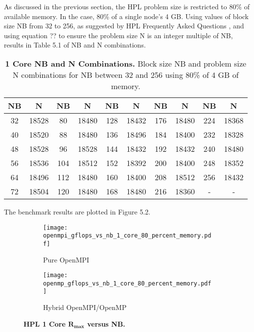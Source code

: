 As discussed in the previous section, the HPL problem size is restricted to 80\% of available memory. In the case, 80\% of a single node's 4 GB. Using values of block size NB from 32 to 256, as suggested by HPL Frequently Asked Questions \cite{hpl-faq}, and using equation ?? to ensure the problem size N is an integer multiple of NB, results in Table 5.1 of NB and N combinations.

\begin{table}[H]
\begin{center}
	\begin{tabular}{ |c|c|c|c|c|c|c|c|c|c| } 
		\hline
		\textbf{NB} & \textbf{N} & \textbf{NB} & \textbf{N} & \textbf{NB} & \textbf{N} & \textbf{NB} & \textbf{N} & \textbf{NB} & \textbf{N} \\ 
		\hline
		32 & 18528 &  80 & 18480 & 128 & 18432 & 176 & 18480 & 224 & 18368 \\ 
		40 & 18520 &  88 & 18480 & 136 & 18496 & 184 & 18400 & 232 & 18328 \\ 
 		48 & 18528 &  96 & 18528 & 144 & 18432 & 192 & 18432 & 240 & 18480 \\
		56 & 18536 & 104 & 18512 & 152 & 18392 & 200 & 18400 & 248 & 18352 \\ 
 		64 & 18496 & 112 & 18480 & 160 & 18400 & 208 & 18512 & 256 & 18432 \\
		72 & 18504 & 120 & 18480 & 168 & 18480 & 216 & 18360 &   - &     - \\ 
 		\hline
	\end{tabular}
\end{center}
\caption{\label{tab:table-name}\textbf{1 Core NB and N Combinations.} Block size NB and problem size N combinations for NB between 32 and 256 using 80\% of 4 GB of memory.}
\end{table}

The benchmark results are plotted in Figure 5.2.

\begin{figure}[H]
	\begin{subfigure}{1.0\textwidth}
		\centering
		\texttt{[image: openmpi\_gflops\_vs\_nb\_1\_core\_80\_percent\_memory.pdf]}
		\caption{Pure OpenMPI}
		\label{fig:subim1}
	\end{subfigure}
	\par\bigskip
	\begin{subfigure}{1.0\textwidth}
		\centering
		\texttt{[image: openmp\_gflops\_vs\_nb\_1\_core\_80\_percent\_memory.pdf]}
		\caption{Hybrid OpenMPI/OpenMP}
		\label{fig:subim2}
	\end{subfigure}
\caption{\textbf{HPL 1 Core $\mathbf{R_{max}}$ versus NB.}}
\label{fig:image2}
\end{figure}

